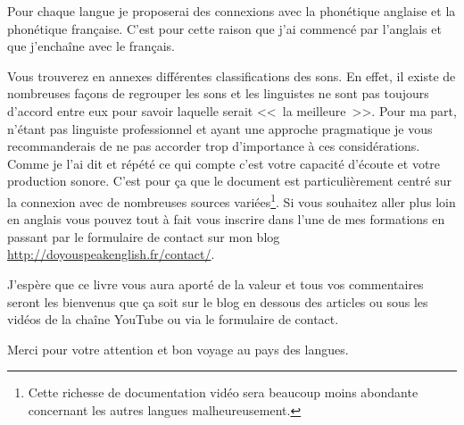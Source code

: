 Pour chaque langue je proposerai des connexions avec la phonétique
anglaise et la phonétique française. C'est pour cette raison que j'ai
commencé par l'anglais et que j'enchaîne avec le français.

Vous trouverez en annexes différentes classifications des sons. En
effet, il existe de nombreuses façons de regrouper les sons et les
linguistes ne sont pas toujours d'accord entre eux pour savoir
laquelle serait <<~la meilleure~>>. Pour ma part, n'étant pas
linguiste professionnel et ayant une approche pragmatique je vous
recommanderais de ne pas accorder trop d'importance à ces
considérations. Comme je l'ai dit et répété ce qui compte c'est votre
capacité d'écoute et votre production sonore. C'est pour ça que le
document est particulièrement centré sur la connexion avec de
nombreuses sources variées\footnote{Cette richesse de documentation
  vidéo sera beaucoup moins abondante concernant les autres
  langues malheureusement.}.
Si vous souhaitez aller plus loin en anglais vous pouvez tout à fait
vous inscrire dans l'une de mes formations en passant par le
formulaire de contact sur mon blog
\url{http://doyouspeakenglish.fr/contact/}.

J'espère que ce livre vous aura aporté de la valeur et tous vos
commentaires seront les bienvenus que ça soit sur le blog en dessous
des articles ou sous les vidéos de la chaîne YouTube ou via le
formulaire de contact.

Merci pour votre attention et bon voyage au pays des langues.
